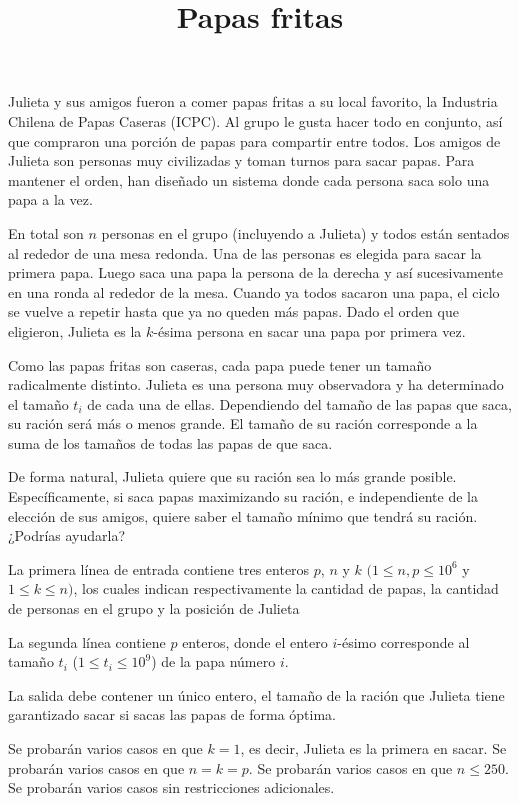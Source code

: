 \documentclass{oci}
\title{Papas fritas}
\begin{document}
\begin{problemDescription}
	Julieta y sus amigos fueron a comer papas fritas a su local favorito,
	la Industria Chilena de Papas Caseras (ICPC).
	Al grupo le gusta hacer todo en conjunto, así que compraron una porción
	de papas para compartir entre todos.
	Los amigos de Julieta son personas muy civilizadas y toman turnos para
	sacar papas.
	Para mantener el orden, han diseñado un sistema donde cada
	persona saca solo una papa a la vez.

	En total son $n$ personas en el grupo (incluyendo a Julieta) y todos están
	sentados al rededor de una mesa redonda.
	Una de las personas es elegida para sacar la primera papa.
	Luego saca una papa la persona de la derecha y así sucesivamente en una
	ronda al rededor de la mesa.
	Cuando ya todos sacaron una papa, el ciclo se vuelve a repetir hasta que ya no
	queden más papas.
	Dado el orden que eligieron, Julieta es la $k$-ésima persona en sacar una papa
	por primera vez.

	Como las papas fritas son caseras, cada papa puede tener un tamaño radicalmente
	distinto.
	Julieta es una persona muy observadora y ha determinado el tamaño $t_i$ de cada una
	de ellas.
	Dependiendo del tamaño de las papas que saca, su ración será más o menos grande.
	El tamaño de su ración corresponde a la suma de los tamaños de todas
	las papas de que saca.

	De forma natural, Julieta quiere que su ración sea lo más grande posible.
	Específicamente, si saca papas maximizando su ración, e independiente
	de la elección de sus amigos, quiere saber el tamaño mínimo que tendrá su ración.
	¿Podrías ayudarla?
\end{problemDescription}

\begin{inputDescription}
	La primera línea de entrada contiene tres enteros $p$, $n$ y $k$
	$(1 \leq n, p \leq 10^6$ y $1 \leq k \leq n)$, los cuales
	indican respectivamente la cantidad de papas, la cantidad de personas en el grupo
	y la posición de Julieta

	La segunda línea contiene $p$ enteros, donde el entero $i$-ésimo
	corresponde al tamaño $t_i$ ($1 \leq t_i \leq 10^9$) de la papa número $i$.
\end{inputDescription}

\begin{outputDescription}
	La salida debe contener un único entero, el tamaño de la ración que Julieta tiene
	garantizado sacar si sacas las papas de forma óptima.
\end{outputDescription}

\begin{scoreDescription}
  	Se probarán varios casos en que $k = 1$, es decir, Julieta es la primera en sacar.
 	Se probarán varios casos en que $n = k = p$.
  	Se probarán varios casos en que $n \leq 250$.
	Se probarán varios casos sin restricciones adicionales.
\end{scoreDescription}

\begin{sampleDescription}
\end{sampleDescription}
\end{document}
